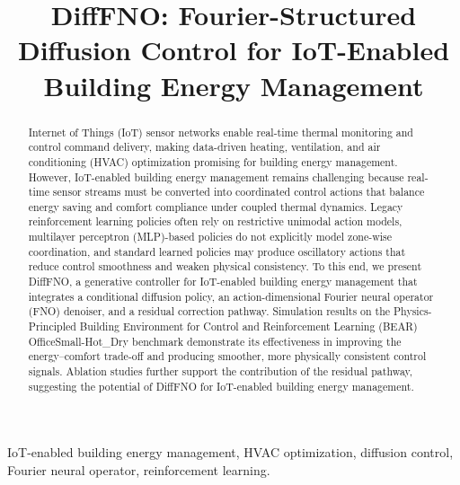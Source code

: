 ﻿\documentclass[conference]{IEEEtran}
\theoremstyle{nonumberplain}
\theoremstyle{plain}
\begin{document}
\title{DiffFNO: Fourier-Structured Diffusion Control for IoT-Enabled Building Energy Management}

\author{
}

\maketitle

\begin{abstract}
Internet of Things (IoT) sensor networks enable real-time thermal monitoring and control command delivery, making data-driven heating, ventilation, and air conditioning (HVAC) optimization promising for building energy management. However, IoT-enabled building energy management remains challenging because real-time sensor streams must be converted into coordinated control actions that balance energy saving and comfort compliance under coupled thermal dynamics. Legacy reinforcement learning policies often rely on restrictive unimodal action models, multilayer perceptron (MLP)-based policies do not explicitly model zone-wise coordination, and standard learned policies may produce oscillatory actions that reduce control smoothness and weaken physical consistency. To this end, we present DiffFNO, a generative controller for IoT-enabled building energy management that integrates a conditional diffusion policy, an action-dimensional Fourier neural operator (FNO) denoiser, and a residual correction pathway. 
Simulation results on the Physics-Principled Building Environment for Control and Reinforcement Learning (BEAR) OfficeSmall-Hot\_Dry benchmark demonstrate its effectiveness in improving the energy--comfort trade-off and producing smoother, more physically consistent control signals. 
Ablation studies further support the contribution of the residual pathway, suggesting the potential of DiffFNO for IoT-enabled building energy management.

\end{abstract}

\begin{IEEEkeywords}
IoT-enabled building energy management, HVAC optimization, diffusion control, Fourier neural operator, reinforcement learning.
\end{IEEEkeywords}
\end{document}
